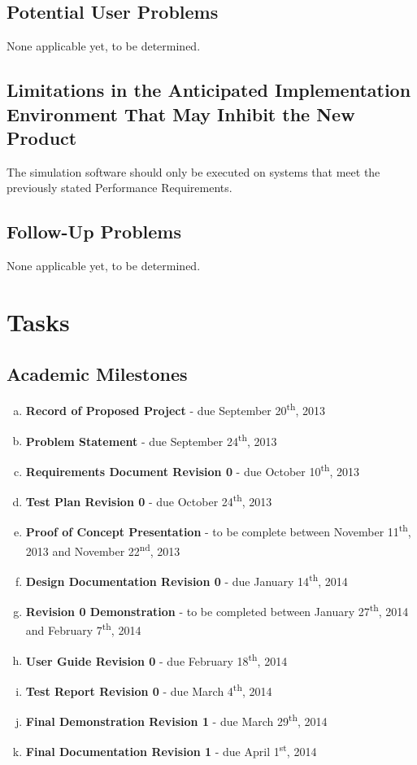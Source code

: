 \documentclass[paper=letter, fontsize=10pt]{scrartcl}
\numberwithin{equation}{section}		%
\numberwithin{figure}{section}			%
\numberwithin{table}{section}				%
\newcommand{\ts}{\textsuperscript}
\begin{document}
\subsection{Potential User Problems}
None applicable yet, to be determined.
\subsection{Limitations in the Anticipated Implementation Environment That May Inhibit the New Product}
The simulation software should only be executed on systems that meet the previously stated Performance Requirements.
\subsection{Follow-Up Problems}
None applicable yet, to be determined.

\section{Tasks}
\subsection{Academic Milestones}
\begin{enumerate}[(a)]	
	\item \textbf{Record of Proposed Project} - due September 20\ts{th}, 2013
	\item \textbf{Problem Statement} - due September 24\ts{th}, 2013
	\item \textbf{Requirements Document Revision 0} - due October 10\ts{th}, 2013
	\item \textbf{Test Plan Revision 0} - due October 24\ts{th}, 2013
	\item \textbf{Proof of Concept Presentation} - to be complete between November 11\ts{th}, 2013 and November 22\ts{nd}, 2013
	\item \textbf{Design Documentation Revision 0} - due  January 14\ts{th}, 2014
	\item \textbf{Revision 0 Demonstration} - to be completed between January 27\ts{th}, 2014 and February 7\ts{th}, 2014
	\item \textbf{User Guide Revision 0} - due February 18\ts{th}, 2014
	\item \textbf{Test Report Revision 0} - due March 4\ts{th}, 2014
	\item \textbf{Final Demonstration Revision 1} - due March 29\ts{th}, 2014
	\item \textbf{Final Documentation Revision 1} - due April 1\ts{st}, 2014
\end{enumerate}
\end{document}
